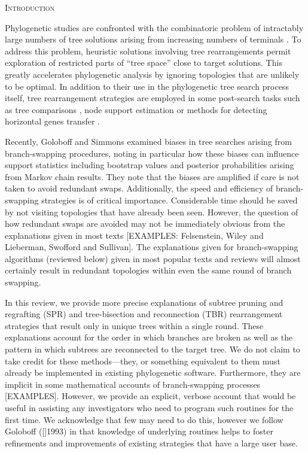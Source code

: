 \documentclass[12pt,letterpaper]{article}
\renewcommand{\section}[1]{%
\bigskip
\begin{center}
\begin{Large}
\normalfont\scshape #1
\medskip
\end{Large}
\end{center}}
\begin{document}
\section{Introduction}

Phylogenetic studies are confronted with the combinatoric problem of intractably large numbers of tree solutions arising from increasing numbers of terminals \citep[]{Felsenstein:1978vh}.
To address this problem, heuristic solutions involving tree rearrangements permit exploration of restricted parts of ``tree space'' close to target solutions.
This greatly accelerates phylogenetic analysis by ignoring topologies that are unlikely to be optimal.
In addition to their use in the phylogenetic tree search process itself, tree rearrangement strategies are employed in some post-search tasks such as tree comparisons \citep[e.g.][]{allen2001subtree,kuhner2015treComparison}, node support estimation \citep[e.g.][]{goloboff2014bias} or methods for detecting horizontal genes transfer \citep[e.g.][]{mcfadden1995something,bordewich2005computational}.

Recently, Goloboff and Simmons \citep[(2014)]{goloboff2014bias} examined biases in tree searches arising from branch-swapping procedures, noting in particular how these biases can influence support statistics including bootstrap values and posterior probabilities arising from Markov chain results.
They note that the biases are amplified if care is not taken to avoid redundant swaps.
Additionally, the speed and efficiency of branch-swapping strategies is of critical importance.
Considerable time should be saved by not visiting topologies that have already been seen.
However, the question of how redundant swaps are avoided may not be immediately obvious from the explanations given in most texts [EXAMPLES: Felsenstein, Wiley and Lieberman, Swofford and Sullivan].
The explanations given for branch-swapping algorithms (reviewed below) given in most popular texts and reviews will almost certainly result in redundant topologies within even the same round of branch swapping.

In this review, we provide more precise explanations of subtree pruning and regrafting (SPR) and tree-bisection and reconnection (TBR) rearrangement strategies that result only in unique trees within a single round. 
These explanations account for the order in which branches are broken as well as the pattern in which subtrees are reconnected to the target tree.
We do not claim to take credit for these methods---they, or something equivalent to them must already be implemented in existing phylogenetic software.
Furthermore, they are implicit in some mathematical accounts of branch-swapping processes [EXAMPLES].
However, we provide an explicit, verbose account that would be useful in assisting any investigators who need to program such routines for the first time. 
We acknowledge that few may need to do this, however we follow Goloboff ([]1993) in that knowledge of underlying routines helps to foster refinements and improvements of existing strategies that have a large user base.
\end{document}
